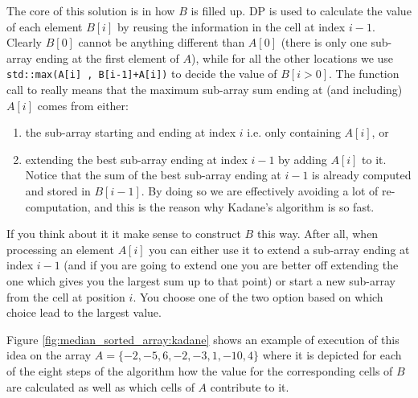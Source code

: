 The core of this solution is in how $B$ is filled up. DP is used to calculate the value of each element $B[i]$ by reusing the information in the cell at index $i-1$. Clearly $B[0]$ cannot be anything different than $A[0]$ (there is only one sub-array ending at the first element of $A$), while for all the other locations we use \lstinline[columns=fixed]{std::max(A[i] , B[i-1]+A[i])} to decide the value of $B[i > 0 ]$. 
The function call to  really means that the maximum sub-array sum ending at (and including) $A[i]$ comes from either:
\begin{enumerate}
	\item the sub-array starting and ending at index $i$ i.e. only containing $A[i]$, or
	\item extending the best sub-array ending at index $i-1$ by adding $A[i]$ to it. Notice that the sum of the
	best sub-array ending at $i-1$ is already computed and stored in $B[i-1]$. By doing so we are
	effectively avoiding a lot of re-computation, and this is the reason why Kadane's algorithm is
	so fast.
\end{enumerate}
If you think about it it make sense to construct $B$ this way. After all, when processing an element $A[i]$ you can either use it to extend a sub-array ending at index $i-1$ (and if you are going to extend one you are better off extending the one which gives you the largest sum up to that point) or start a new sub-array from the cell at position $i$. You choose one of the two option based on which choice lead to the largest value. 

Figure \ref{fig:median_sorted_array:kadane} shows an example of execution of this idea on the array $A=\{-2,-5,6,-2,-3,1,-10,4\}$ where it is depicted for each of the eight steps of the algorithm how the value for the corresponding cells of $B$ are calculated as well as which cells of $A$ contribute to it.

